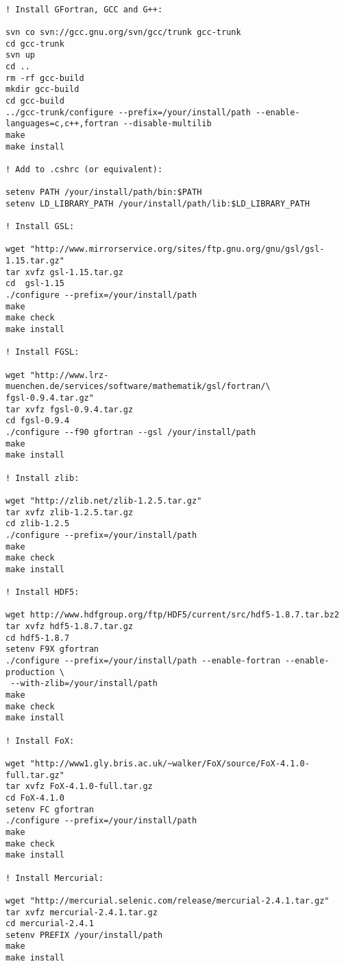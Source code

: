 \begin{lstlisting}[language=simple,stringstyle=\normalfont \ttfamily,commentstyle=\itshape]

! Install GFortran, GCC and G++:

svn co svn://gcc.gnu.org/svn/gcc/trunk gcc-trunk
cd gcc-trunk
svn up
cd ..
rm -rf gcc-build
mkdir gcc-build
cd gcc-build
../gcc-trunk/configure --prefix=/your/install/path --enable-languages=c,c++,fortran --disable-multilib
make
make install

! Add to .cshrc (or equivalent):

setenv PATH /your/install/path/bin:$PATH                                                                                           
setenv LD_LIBRARY_PATH /your/install/path/lib:$LD_LIBRARY_PATH

! Install GSL:

wget "http://www.mirrorservice.org/sites/ftp.gnu.org/gnu/gsl/gsl-1.15.tar.gz"
tar xvfz gsl-1.15.tar.gz
cd  gsl-1.15
./configure --prefix=/your/install/path
make
make check
make install

! Install FGSL:

wget "http://www.lrz-muenchen.de/services/software/mathematik/gsl/fortran/\
fgsl-0.9.4.tar.gz"
tar xvfz fgsl-0.9.4.tar.gz
cd fgsl-0.9.4
./configure --f90 gfortran --gsl /your/install/path
make
make install

! Install zlib:

wget "http://zlib.net/zlib-1.2.5.tar.gz"
tar xvfz zlib-1.2.5.tar.gz
cd zlib-1.2.5
./configure --prefix=/your/install/path
make
make check
make install

! Install HDF5:

wget http://www.hdfgroup.org/ftp/HDF5/current/src/hdf5-1.8.7.tar.bz2
tar xvfz hdf5-1.8.7.tar.gz
cd hdf5-1.8.7
setenv F9X gfortran
./configure --prefix=/your/install/path --enable-fortran --enable-production \
 --with-zlib=/your/install/path
make
make check
make install

! Install FoX:

wget "http://www1.gly.bris.ac.uk/~walker/FoX/source/FoX-4.1.0-full.tar.gz"
tar xvfz FoX-4.1.0-full.tar.gz
cd FoX-4.1.0
setenv FC gfortran
./configure --prefix=/your/install/path
make
make check
make install

! Install Mercurial:

wget "http://mercurial.selenic.com/release/mercurial-2.4.1.tar.gz"
tar xvfz mercurial-2.4.1.tar.gz
cd mercurial-2.4.1
setenv PREFIX /your/install/path
make
make install


\end{lstlisting}
